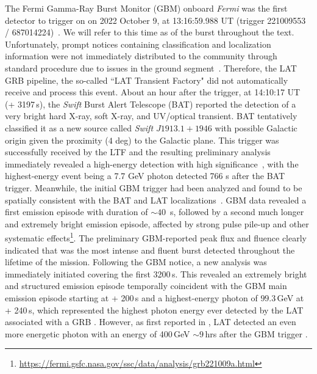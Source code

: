 \documentclass[preprint]{aastex631}
\begin{document}
The Fermi Gamma-Ray Burst Monitor (GBM) onboard {\it Fermi} was the first detector to trigger on \grb on 2022 October 9, at 13:16:59.988 UT (trigger 221009553 / 687014224)~\citep{2023ApJ...952L..42L}. We will refer to this time as \trig of the burst throughout the text. Unfortunately, prompt notices containing classification and localization information were not immediately distributed to the community through standard procedure due to issues in the ground segment~\citep{2023ApJ...952L..42L}.
Therefore, the LAT GRB pipeline, the so-called ``LAT Transient Factory" \citep[LTF,][]{2015arXiv150203122V} did not automatically receive and process this event. 
About an hour after the trigger, at 14:10:17 UT (\trig+ 3197\,s), the {\it Swift} Burst Alert Telescope (BAT) reported the detection of a very bright hard X-ray, soft X-ray, and UV/optical transient. BAT tentatively classified it as a new source called {\it Swift $J1913.1+1946$} \citep{2022GCN.32632....1D} with possible Galactic origin given the proximity ($4$ deg) to the Galactic plane. This trigger was successfully received by the LTF and the resulting preliminary analysis immediately revealed a high-energy detection with high significance~\citep{2022GCN.32637....1B}, with the highest-energy event being a 7.7 GeV photon detected 766 s after the BAT trigger. Meanwhile, the initial GBM trigger had been analyzed and found to be spatially consistent with the BAT and LAT localizations~\citep{2022GCN.32642....1L}. GBM data revealed a first emission episode with duration of $\sim 40$~s, followed by a second much longer and extremely bright emission episode, affected by strong pulse pile-up and other systematic effects\footnote{\url{https://fermi.gsfc.nasa.gov/ssc/data/analysis/grb221009a.html}}. 
The preliminary GBM-reported peak flux and fluence clearly indicated that \grb was the most intense and fluent burst detected throughout the lifetime of the \Fermi mission.
Following the GBM notice, a new analysis was immediately initiated covering the first 3200\,s. 
This revealed an extremely bright and structured emission episode temporally coincident with the GBM main emission episode starting at \trig+ 200\,s and a highest-energy photon of $99.3$\,GeV at \trig+ 240\,s, which represented the highest photon energy ever detected by the LAT~\citep{2022GCN.32658....1P} associated with a GRB .
However, as first reported in \citet{2022GCN.32748....1X}, LAT detected an even more energetic photon with an energy of 400\,GeV $\sim 9$\,hrs after the GBM trigger \citep{2024NatCo..15.4280X}.
\end{document}
